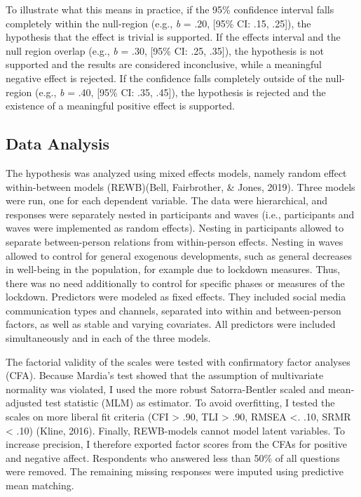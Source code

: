 \documentclass[
  english,
  man,mask,floatsintext]{apa6}
\begin{document}
To illustrate what this means in practice, if the 95\% confidence interval falls completely within the null-region (e.g., \emph{b} = .20, {[}95\% CI: .15, .25{]}), the hypothesis that the effect is trivial is supported.
If the effects interval and the null region overlap (e.g., \emph{b} = .30, {[}95\% CI: .25, .35{]}), the hypothesis is not supported and the results are considered inconclusive, while a meaningful negative effect is rejected.
If the confidence falls completely outside of the null-region (e.g., \emph{b} = .40, {[}95\% CI: .35, .45{]}), the hypothesis is rejected and the existence of a meaningful positive effect is supported.

\hypertarget{data-analysis}{%
\subsection{Data Analysis}\label{data-analysis}}

The hypothesis was analyzed using mixed effects models, namely random effect within-between models (REWB)(Bell, Fairbrother, \& Jones, 2019).
Three models were run, one for each dependent variable.
The data were hierarchical, and responses were separately nested in participants and waves (i.e., participants and waves were implemented as random effects).
Nesting in participants allowed to separate between-person relations from within-person effects.
Nesting in waves allowed to control for general exogenous developments, such as general decreases in well-being in the population, for example due to lockdown measures.
Thus, there was no need additionally to control for specific phases or measures of the lockdown.
Predictors were modeled as fixed effects.
They included social media communication types and channels, separated into within and between-person factors, as well as stable and varying covariates.
All predictors were included simultaneously and in each of the three models.

The factorial validity of the scales were tested with confirmatory factor analyses (CFA).
Because Mardia's test showed that the assumption of multivariate normality was violated, I used the more robust Satorra-Bentler scaled and mean-adjusted test statistic (MLM) as estimator.
To avoid overfitting, I tested the scales on more liberal fit criteria (CFI \textgreater{} .90, TLI \textgreater{} .90, RMSEA \textless. .10, SRMR \textless{} .10) (Kline, 2016).
Finally, REWB-models cannot model latent variables.
To increase precision, I therefore exported factor scores from the CFAs for positive and negative affect.
Respondents who answered less than 50\% of all questions were removed.
The remaining missing responses were imputed using predictive mean matching.
\end{document}
